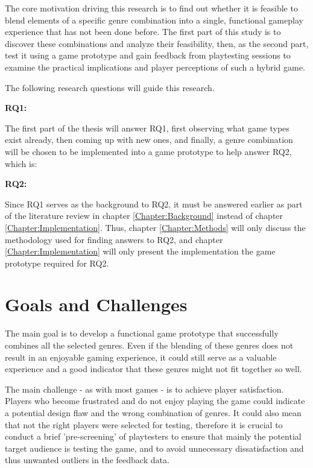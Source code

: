 The core motivation driving this research is to find out whether it is feasible to blend elements of a specific genre combination into a single, functional gameplay experience that has not been done before. The first part of this study is to discover these combinations and analyze their feasibility, then, as the second part, test it using a game prototype and gain feedback from playtesting sessions to examine the practical implications and player perceptions of such a hybrid game.

The following research questions will guide this research.

\textbf{RQ1:} \researchQuestionOne

The first part of the thesis will answer RQ1, first observing what game types exist already, then coming up with new ones, and finally, a genre combination will be chosen to be implemented into a game prototype to help answer RQ2, which is:


\textbf{RQ2:} \researchQuestionTwo

Since RQ1 serves as the background to RQ2, it must be answered earlier as part of the literature review in chapter \ref{Chapter:Background} instead of chapter \ref{Chapter:Implementation}. Thus, chapter \ref{Chapter:Methods} will only discuss the methodology used for finding answers to RQ2, and chapter \ref{Chapter:Implementation} will only present the implementation the game prototype required for RQ2.  



\section{Goals and Challenges}

The main goal is to develop a functional game prototype that successfully combines all the selected genres. Even if the blending of these genres does not result in an enjoyable gaming experience, it could still serve as a valuable experience and a good indicator that these genres might not fit together so well.

The main challenge - as with most games - is to achieve player satisfaction. Players who become frustrated and do not enjoy playing the game could indicate a potential design flaw and the wrong combination of genres. It could also mean that not the right players were selected for testing, therefore it is crucial to conduct a brief 'pre-screening' of playtesters to ensure that mainly the potential target audience is testing the game, and to avoid unnecessary dissatisfaction and thus unwanted outliers in the feedback data.